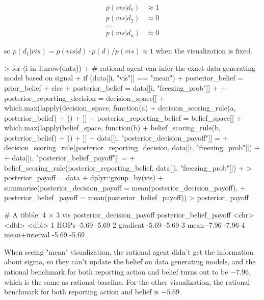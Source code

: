 \documentclass{article}
\begin{document}
\begin{align*}
    p(vis|d_1) &\approx 1\\
    p(vis|d_2) &\approx 0\\
    ...&\\
    p(vis|d_n) &\approx 0
\end{align*}

so $p(d_1|vis) = p(vis|d) \cdot p(d) / p(vis) \approx 1$ when the visualization is fixed.

\begin{Schunk}
\begin{Sinput}
> for (i in 1:nrow(data)) {
+   # rational agent can infer the exact data generating model based on signal
+   if (data[[i, "vis"]] == "mean") {
+     posterior_belief = prior_belief
+   } else {
+     posterior_belief = data[[i, "freezing_prob"]]
+   }
+   posterior_reporting_decision = decision_space[[
+     which.max(lapply(decision_space, function(a) {
+       decision_scoring_rule(a, posterior_belief)
+     }))
+   ]]
+   posterior_reporting_belief = belief_space[[
+     which.max(lapply(belief_space, function(b) {
+       belief_scoring_rule(b, posterior_belief)
+     }))
+   ]]
+   data[[i, "posterior_decision_payoff"]] = 
+     decision_scoring_rule(posterior_reporting_decision, data[[i, "freezing_prob"]])
+   
+   data[[i, "posterior_belief_payoff"]] = 
+     belief_scoring_rule(posterior_reporting_belief, data[[i, "freezing_prob"]])
+ }
> posterior_payoff = data %>%
+   dplyr::group_by(vis) %>%
+   summarise(posterior_decision_payoff = mean(posterior_decision_payoff),
+             posterior_belief_payoff = mean(posterior_belief_payoff))
> posterior_payoff
\end{Sinput}
\begin{Soutput}
# A tibble: 4 × 3
  vis           posterior_decision_payoff posterior_belief_payoff
  <chr>                             <dbl>                   <dbl>
1 HOPs                              -5.69                   -5.69
2 gradient                          -5.69                   -5.69
3 mean                              -7.96                   -7.96
4 mean+interval                     -5.69                   -5.69
\end{Soutput}
\end{Schunk}

When seeing "mean" visualization, the rational agent didn't get the information about sigma, so they can't update the belief on data generating models, and the rational benchmark for both reporting action and belief turns out to be $-7.96$, which is the same as rational baseline. For the other visualization, the rational benchmark for both reporting action and belief is $-5.69$.
\end{document}
